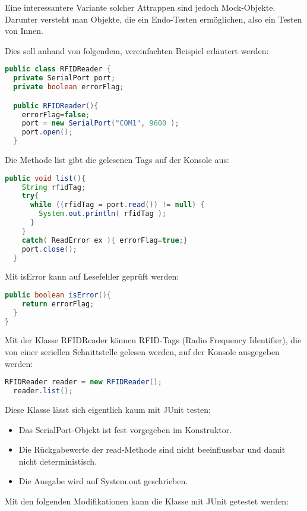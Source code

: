 Eine interessantere Variante solcher
Attrappen sind jedoch Mock-Objekte. Darunter versteht man Objekte, die ein
Endo-Testen ermöglichen, also ein Testen von Innen.

\newslide
Dies soll anhand von folgendem, vereinfachten Beispiel erläutert werden:
\begin{lstlisting}[language=java]
public class RFIDReader {
  private SerialPort port;
  private boolean errorFlag;

  public RFIDReader(){
    errorFlag=false;
    port = new SerialPort("COM1", 9600 );
    port.open();
  }
\end{lstlisting}
\newslide
Die Methode list gibt die gelesenen Tags auf der Konsole aus:
\begin{lstlisting}[language=java]
  public void list(){
    String rfidTag;
    try{
      while ((rfidTag = port.read()) != null) {
        System.out.println( rfidTag );
      }
    }
    catch( ReadError ex ){ errorFlag=true;}
    port.close();
  }
\end{lstlisting}
\newslide
Mit isError kann auf Lesefehler geprüft werden:
\begin{lstlisting}[language=java]
public boolean isError(){
    return errorFlag;
  }
}
\end{lstlisting}
\newslide
Mit der Klasse RFIDReader können RFID-Tags (Radio Frequency Identifier), die
von einer seriellen Schnittstelle gelesen werden, auf der Konsole ausgegeben
werden:
\begin{lstlisting}[language=java]
  RFIDReader reader = new RFIDReader();
  reader.list();
\end{lstlisting}
\newslide
Diese Klasse lässt sich eigentlich kaum mit JUnit testen:
\begin{itemize}
\item Das SerialPort-Objekt ist fest vorgegeben im Konstruktor.
\item Die Rückgabewerte der read-Methode sind nicht beeinflussbar und damit
  nicht deterministisch.
\item Die Ausgabe wird auf System.out geschrieben.
\end{itemize}
\newslide
Mit den folgenden Modifikationen kann die Klasse mit JUnit getestet werden:

